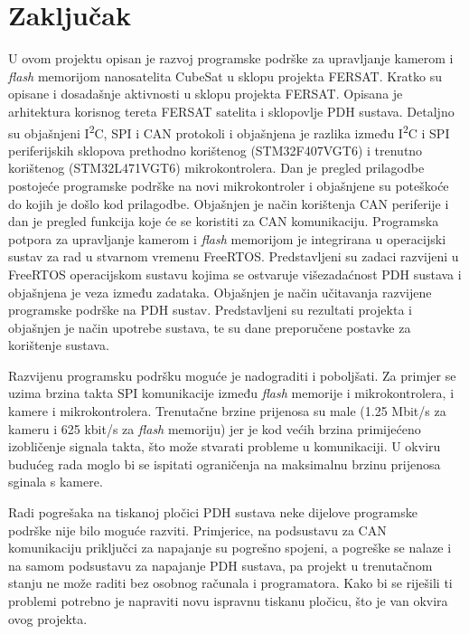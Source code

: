 \chapter{Zaključak}

U ovom projektu opisan je razvoj programske podrške za 
upravljanje kamerom i \textit{flash} memorijom nanosatelita 
CubeSat u sklopu projekta FERSAT. Kratko su opisane i dosadašnje
 aktivnosti u sklopu projekta FERSAT. Opisana je arhitektura korisnog
 tereta FERSAT satelita i sklopovlje PDH sustava. 
 Detaljno su objašnjeni I\textsuperscript{2}C, SPI i 
 CAN protokoli i objašnjena je razlika između 
 I\textsuperscript{2}C i SPI periferijskih sklopova prethodno 
 korištenog (STM32F407VGT6) i trenutno korištenog (STM32L471VGT6) 
 mikrokontrolera. Dan je pregled prilagodbe postojeće programske podrške na novi mikrokontroler i 
 objašnjene su poteškoće do kojih je došlo kod prilagodbe. Objašnjen je način korištenja CAN periferije i dan je pregled 
 funkcija koje će se koristiti za CAN komunikaciju. 
 Programska potpora za upravljanje kamerom i 
 \textit{flash} memorijom je integrirana u operacijski sustav 
 za rad u stvarnom vremenu FreeRTOS. 
 Predstavljeni su zadaci razvijeni u FreeRTOS operacijskom 
 sustavu kojima se ostvaruje višezadaćnost PDH sustava i 
 objašnjena je veza između zadataka. Objašnjen je način 
 učitavanja razvijene programske podrške na PDH sustav. 
 Predstavljeni su rezultati projekta i objašnjen je način 
 upotrebe sustava, te su dane preporučene postavke za 
 korištenje sustava.

Razvijenu programsku podršku moguće je nadograditi i poboljšati. 
Za primjer se uzima brzina takta SPI komunikacije između \textit{flash} memorije i mikrokontrolera, i kamere i mikrokontrolera. %
 Trenutačne brzine prijenosa su male (1.25 Mbit/s za kameru i 625 kbit/s za \textit{flash} memoriju) 
 jer je kod većih brzina primijećeno izobličenje signala takta, što može stvarati probleme u komunikaciji. 
U okviru budućeg rada moglo bi se ispitati ograničenja na maksimalnu 
brzinu prijenosa sginala s kamere.

Radi pogrešaka na tiskanoj pločici PDH sustava neke dijelove programske podrške nije bilo moguće razviti. 
Primjerice, na podsustavu za CAN komunikaciju priključci
za napajanje su pogrešno spojeni, a pogreške se nalaze 
i na samom podsustavu za napajanje PDH sustava, 
pa projekt u trenutačnom stanju ne može raditi bez 
osobnog računala i programatora. 
Kako bi se riješili ti problemi potrebno je napraviti novu 
ispravnu tiskanu pločicu, što je van okvira ovog projekta.
